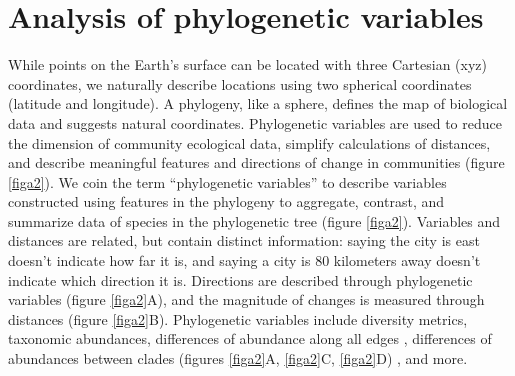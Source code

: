 \section{Analysis of phylogenetic variables}
While points on the Earth's surface can be located with three Cartesian (xyz) coordinates, we naturally describe locations using two spherical coordinates (latitude and longitude). A phylogeny, like a sphere, defines the map of biological data and suggests natural coordinates. Phylogenetic variables are used to reduce the dimension of community ecological data, simplify calculations of distances, and describe meaningful features and directions of change in communities (figure \ref{figa2}).
We coin the term “phylogenetic variables” to describe variables constructed using features in the phylogeny to aggregate, contrast, and summarize data of species in the phylogenetic tree (figure \ref{figa2}). Variables and distances are related, but contain distinct information: saying the city is east doesn't indicate how far it is, and saying a city is 80 kilometers away doesn't indicate which direction it is. Directions are described through phylogenetic variables (figure \ref{figa2}A), and the magnitude of changes is measured through distances (figure \ref{figa2}B). Phylogenetic variables include diversity metrics, taxonomic abundances, differences of abundance along all edges \cite{picante}, differences of abundances between clades (figures \ref{figa2}A, \ref{figa2}C, \ref{figa2}D) \cite{Washburne2017-up} \cite{Silverman2016-he}, and more. \par
